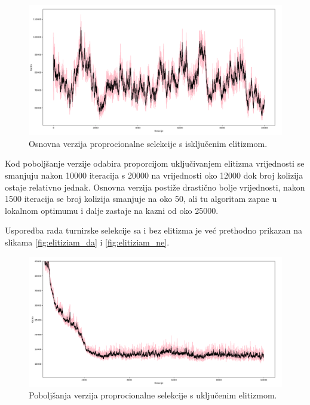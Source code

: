 \documentclass[times, utf8, zavrsni]{fer}
\begin{document}
\begin{figure}[htb]
\centering
\includegraphics[width=14cm]{images/proporcije_e_ne_gore.png}
\caption{Osnovna verzija proprocionalne selekcije s isključenim elitizmom.}
\label{fig:proporcije_e_ne_gore}
\end{figure}

\newpage

Kod poboljšanje verzije odabira proporcijom uključivanjem elitizma vrijednosti se smanjuju nakon 10000 iteracija s 20000 na vrijednosti oko 12000 dok broj kolizija ostaje relativno jednak. Osnovna verzija postiže drastično bolje vrijednosti, nakon 1500 iteracija se broj kolizija smanjuje na oko 50, ali tu algoritam zapne u lokalnom optimumu i dalje zastaje na kazni od oko 25000.

Usporedba rada turnirske selekcije sa i bez elitizma je već prethodno prikazan na slikama \ref{fig:elitiziam_da} i \ref{fig:elitiziam_ne}.

\begin{figure}[htb]
\centering
\includegraphics[width=14cm]{images/proporcije_e_da.png}
\caption{Poboljšanja verzija proprocionalne selekcije s uključenim elitizmom.}
\label{fig:prop_e_da}
\end{figure}
\end{document}
